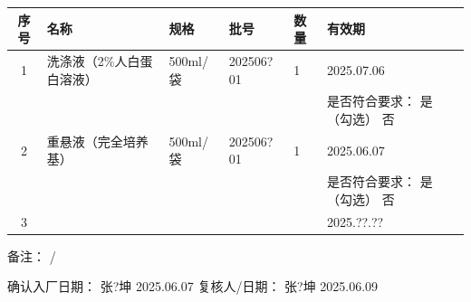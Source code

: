 \documentclass[UTF8,10pt,a4paper,fontset=fandol]{ctexart}
\newcommand{\fieldvalue}[1]{#1}
\newcommand{\handwritten}[1]{#1}
\begin{document}
\begin{tabularx}{\textwidth}{|c|X|X|X|X|X|}
\hline
序号 & 名称 & 规格 & 批号 & 数量 & 有效期 \\
\hline
1 &
洗涤液（2\%人白蛋白溶液） &
500ml/袋 &
\fieldvalue{\handwritten{202506?01}} &
\fieldvalue{\handwritten{1}} &
\fieldvalue{\handwritten{2025.07.06}} \\
\hline
\multicolumn{1}{|c|}{} &
\multicolumn{1}{X|}{} &
\multicolumn{1}{X|}{} &
\multicolumn{1}{X|}{} &
\multicolumn{1}{X|}{} &
\multicolumn{1}{X|}{是否符合要求：%
\fieldvalue{\handwritten{是（勾选）}} \quad 否} \\
\hline
2 &
重悬液（完全培养基） &
500ml/袋 &
\fieldvalue{\handwritten{202506?01}} &
\fieldvalue{\handwritten{1}} &
\fieldvalue{\handwritten{2025.06.07}} \\
\hline
\multicolumn{1}{|c|}{} &
\multicolumn{1}{X|}{} &
\multicolumn{1}{X|}{} &
\multicolumn{1}{X|}{} &
\multicolumn{1}{X|}{} &
\multicolumn{1}{X|}{是否符合要求：%
\fieldvalue{\handwritten{是（勾选）}} \quad 否} \\
\hline
3 & & & & &
\fieldvalue{\handwritten{2025.??.??}} \\
\hline
\end{tabularx}

备注：%
\fieldvalue{\handwritten{/}}

\noindent
确认入厂日期：%
\fieldvalue{\handwritten{张?坤}}\quad
\fieldvalue{\handwritten{2025.06.07}}
\hfill
复核人/日期：%
\fieldvalue{\handwritten{张?坤}}\quad
\fieldvalue{\handwritten{2025.06.09}}
\end{document}
